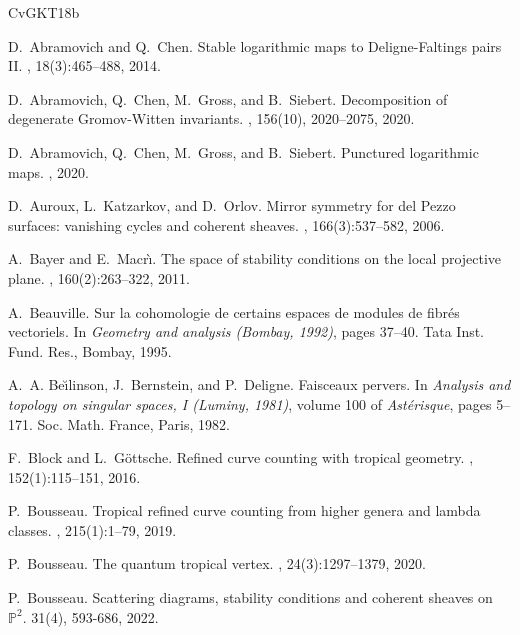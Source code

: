 \documentclass[11pt,letterpaper]{amsart}
\newcommand\PP{\mathbb P}
\begin{document}
\begin{thebibliography}{CvGKT18b}

D.~Abramovich and Q.~Chen.
\newblock Stable logarithmic maps to {D}eligne-{F}altings pairs {II}.
, 18(3):465--488, 2014.


D.~Abramovich, Q.~Chen, M.~Gross, and B.~Siebert.
\newblock Decomposition of degenerate {G}romov-{W}itten invariants.
, 156(10), 2020--2075, 2020.

D.~Abramovich, Q.~Chen, M.~Gross, and B.~Siebert.
\newblock Punctured logarithmic maps.
, 2020.


D.~Auroux, L.~Katzarkov, and D.~Orlov.
\newblock Mirror symmetry for del {P}ezzo surfaces: vanishing cycles and
  coherent sheaves.
, 166(3):537--582, 2006.

A.~Bayer and E.~Macr\`\i.
\newblock The space of stability conditions on the local projective plane.
, 160(2):263--322, 2011.

A.~Beauville.
\newblock Sur la cohomologie de certains espaces de modules de fibr\'es
  vectoriels.
\newblock In {\em Geometry and analysis ({B}ombay, 1992)}, pages 37--40. Tata
  Inst. Fund. Res., Bombay, 1995.

A.~A. Be\u{\i}linson, J.~Bernstein, and P.~Deligne.
\newblock Faisceaux pervers.
\newblock In {\em Analysis and topology on singular spaces, {I} ({L}uminy,
  1981)}, volume 100 of {\em Ast\'{e}risque}, pages 5--171. Soc. Math. France,
  Paris, 1982.
  

F.~Block and L.~G\"ottsche.
\newblock Refined curve counting with tropical geometry.
, 152(1):115--151, 2016.



P.~Bousseau.
\newblock Tropical refined curve counting from higher genera and lambda
  classes.
, 215(1):1--79, 2019.


P.~Bousseau.
\newblock The quantum tropical vertex.
, 24(3):1297--1379, 2020.


P.~Bousseau.
\newblock Scattering diagrams, stability conditions and coherent sheaves on
  {$\PP^2$}.
 31(4), 593-686, 2022.



\end{thebibliography}
\end{document}
